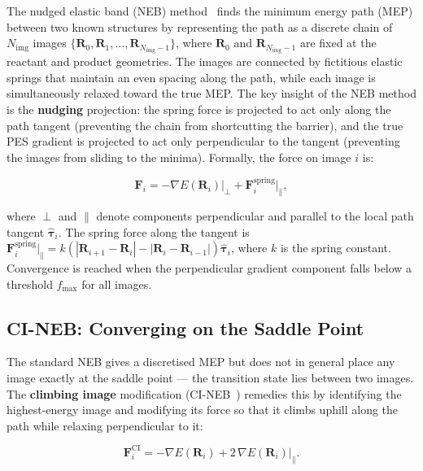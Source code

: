 The nudged elastic band (NEB) method~\cite{jonsson1998, henkelman2000tangent}
finds the minimum energy path (MEP) between two known structures by representing
the path as a discrete chain of $N_\text{img}$ images $\{\mathbf{R}_0, \mathbf{R}_1,
\ldots, \mathbf{R}_{N_\text{img}-1}\}$, where $\mathbf{R}_0$ and
$\mathbf{R}_{N_\text{img}-1}$ are fixed at the reactant and product geometries.
The images are connected by fictitious elastic springs that maintain an even spacing
along the path, while each image is simultaneously relaxed toward the true MEP. The
key insight of the NEB method is the \textbf{nudging} projection: the spring force
is projected to act only along the path tangent (preventing the chain from shortcutting
the barrier), and the true PES gradient is projected to act only perpendicular to the
tangent (preventing the images from sliding to the minima). Formally, the force on
image $i$ is:

\begin{equation}
  \mathbf{F}_i = -\nabla E(\mathbf{R}_i)\big|_\perp + \mathbf{F}_i^\text{spring}\big|_\parallel,
\end{equation}

where $\perp$ and $\parallel$ denote components perpendicular and parallel to the
local path tangent $\hat{\boldsymbol{\tau}}_i$. The spring force along the tangent
is $\mathbf{F}_i^\text{spring}\big|_\parallel = k(|\mathbf{R}_{i+1} - \mathbf{R}_i|
- |\mathbf{R}_i - \mathbf{R}_{i-1}|)\hat{\boldsymbol{\tau}}_i$, where $k$ is the
spring constant. Convergence is reached when the perpendicular gradient component
falls below a threshold $f_\text{max}$ for all images.

\subsection{CI-NEB: Converging on the Saddle Point}

The standard NEB gives a discretised MEP but does not in general place any image
exactly at the saddle point --- the transition state lies between two images.
The \textbf{climbing image} modification (CI-NEB~\cite{henkelman2000cineb}) remedies
this by identifying the highest-energy image and modifying its force so that it
climbs uphill along the path while relaxing perpendicular to it:

\begin{equation}
  \mathbf{F}_i^\text{CI} = -\nabla E(\mathbf{R}_i) +
  2\,\nabla E(\mathbf{R}_i)\big|_\parallel.
\end{equation}

